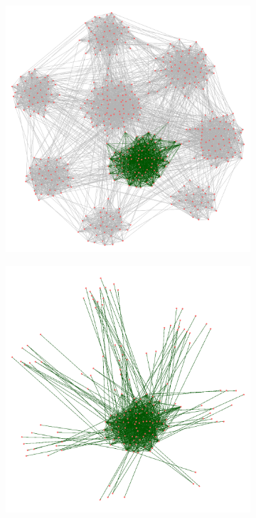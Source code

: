 \begin{figure}
\centering
	\begin{subfigure}{0.31\textwidth}
		\includegraphics[width=\linewidth]{img/ExpectedNodes/LF/Graphe_Complet_select.png}
		\caption{}
	\end{subfigure}
	\begin{subfigure}{0.31\textwidth}
		\includegraphics[width=\linewidth]{img/ExpectedNodes/LF/E2_bis.png}

\end{subfigure}
\end{figure}
